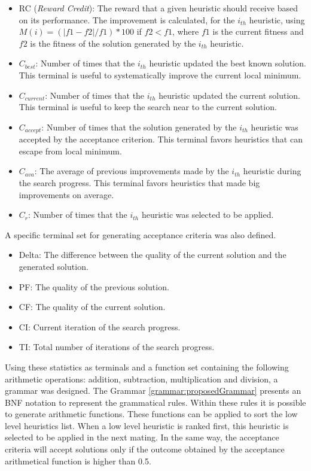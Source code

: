 \documentclass[conference]{IEEEtran}
\begin{document}
\begin{itemize}
	\item RC (\textit{Reward Credit}): The reward that a given heuristic should receive based on its performance. The improvement is calculated, for the $i_{th}$ heuristic, using $M(i) = (|f1 -f2|/f1)*100$ if $f2< f1$, where $f1$ is the current fitness and $f2$ is the fitness of the solution generated by the $i_{th}$ heuristic.
	
 	\item $C_{best}$: Number of times that the $i_{th}$ heuristic updated the best known solution. This terminal is useful to systematically improve the current local minimum.  

	\item $C_{current}$: Number of times that the $i_{th}$ heuristic updated the current solution. This terminal is useful to keep the search near to the current solution.

	\item $C_{accept}$: Number of times that the solution generated
	by the $i_{th}$ heuristic was accepted by the acceptance criterion. This terminal favors heuristics that can escape from local minimum.

	\item $C_{ava}$: The average of previous improvements made by the $i_{th}$ heuristic during the search progress. This terminal favors heuristics that made big improvements on average.
	\item $C_r$: Number of times that the $i_{th}$ heuristic was selected to be applied.
	
	\end{itemize} 

A specific terminal set for generating acceptance criteria was also defined.


 \begin{itemize}
 	 \item Delta: The difference between the quality of the current solution and the generated solution.
 	\item PF: The quality of the previous solution.
 	\item CF: The quality of the current solution.
 	\item CI: Current iteration of the search progress.
 	\item TI: Total number of iterations of the search progress.
 \end{itemize}
	 
  Using these statistics as terminals and a function set containing the following arithmetic operations: addition, subtraction, multiplication and division, a grammar was designed. The Grammar \ref{grammar:proposedGrammar} presents an BNF notation to represent the grammatical rules. Within these rules it is possible to generate arithmetic functions. These functions can be applied to sort the low level heuristics list. When a low level heuristic is ranked first, this heuristic is selected to be applied in the next mating. In the same way, the acceptance criteria will accept solutions only if the outcome obtained by the acceptance arithmetical function is higher than 0.5.
  
\end{document}
